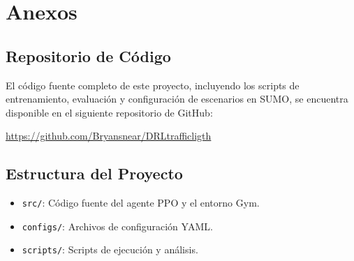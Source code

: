 \chapter{Anexos}

\section{Repositorio de Código}

El código fuente completo de este proyecto, incluyendo los scripts de entrenamiento, evaluación y configuración de escenarios en SUMO, se encuentra disponible en el siguiente repositorio de GitHub:

\url{https://github.com/Bryansnear/DRLtrafficligth}

\section{Estructura del Proyecto}
\begin{itemize}
    \item \texttt{src/}: Código fuente del agente PPO y el entorno Gym.
    \item \texttt{configs/}: Archivos de configuración YAML.
    \item \texttt{scripts/}: Scripts de ejecución y análisis.
\end{itemize}